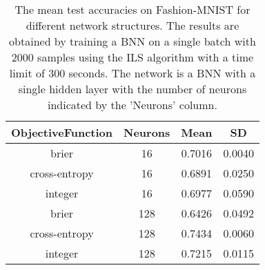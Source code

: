 \begin{center}
\begin{table}[H]
\centering
\begin{tabular}{|c|c|c|c|}
  \hline
ObjectiveFunction & Neurons & Mean & SD \\ 
  \hline
brier & 16 & 0.7016 & 0.0040 \\ 
   \hline
cross-entropy & 16 & 0.6891 & 0.0250 \\ 
   \hline
integer & 16 & 0.6977 & 0.0590 \\ 
   \hline
brier & 128 & 0.6426 & 0.0492 \\ 
   \hline
cross-entropy & 128 & 0.7434 & 0.0060 \\ 
   \hline
integer & 128 & 0.7215 & 0.0115 \\ 
   \hline
\end{tabular}
\caption{The mean test accuracies on Fashion-MNIST for different network structures. The results are obtained by training a BNN
            on a single batch with 2000 samples using the ILS algorithm with a time limit of 300 seconds.
            The network is a BNN with a single hidden layer with the number of neurons indicated by the 'Neurons' column.} 
\label{SBT_DNS_FMNIST}
\end{table}

\end{center}
